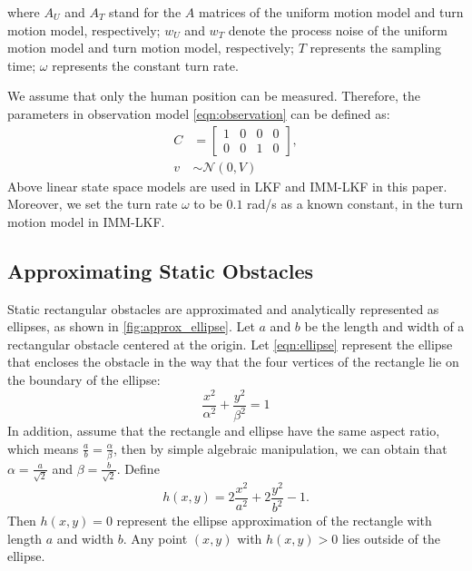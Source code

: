 \documentclass[letterpaper, 10 pt, conference]{ieeeconf}
\begin{document}
	where $A_U$ and $A_T$ stand for the $A$ matrices of the uniform motion model and turn motion model, respectively; $w_U$ and $w_T$ denote the process noise of the uniform motion model and turn motion model, respectively; $T$ represents the sampling time; $\omega$ represents the constant turn rate.
	
	We assume that only the human position can be measured.
	Therefore, the parameters in observation model \cref{eqn:observation} can be defined as:
	\begin{subequations}
		\begin{align*}
			C&=\left[
			\begin{array}{cccc}
				1& 0& 0& 0\\
				0& 0& 1& 0
			\end{array}\right],\\
			v&\sim\mathcal{N}(0,V)
		\end{align*}
	\end{subequations}
	Above linear state space models are used in LKF and IMM-LKF in this paper.
	Moreover, we set the turn rate $\omega$ to be $0.1$ rad/s as a known constant, in the turn motion model in IMM-LKF. 
	
	\subsection{Approximating Static Obstacles}\label{subsec:ellip_approx}
	Static rectangular obstacles are approximated and analytically represented as ellipses, as shown in \cref{fig:approx_ellipse}.
	Let $a$ and $b$ be the length and width of a rectangular obstacle centered at the origin.
	Let \cref{eqn:ellipse} represent the ellipse that encloses the obstacle in the way that the four vertices of the rectangle lie on the boundary of the ellipse:
	\begin{equation}\label{eqn:ellipse}
		\frac{x^2}{\alpha^2}+\frac{y^2}{\beta^2}=1
	\end{equation}
	In addition, assume that the rectangle and ellipse have the same aspect ratio, which means $\frac{a}{b}=\frac{\alpha}{\beta}$, then by simple algebraic manipulation, we can obtain that $\alpha=\frac{a}{\sqrt{2}}$ and $\beta=\frac{b}{\sqrt{2}}$.
	Define
	\begin{equation*}
	h(x,y)=2\frac{x^2}{a^2}+2\frac{y^2}{b^2}-1.
	\end{equation*}
	Then $h(x,y)=0$ represent the ellipse approximation of the rectangle with length $a$ and width $b$.
	Any point $(x,y)$ with $h(x,y)>0$ lies outside of the ellipse.
	
\end{document}
